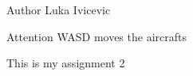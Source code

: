 \begin{DoxyAuthor}{Author}
Luka Ivicevic
\end{DoxyAuthor}
\begin{DoxyAttention}{Attention}
WASD moves the aircrafts
\end{DoxyAttention}
This is my assignment 2 